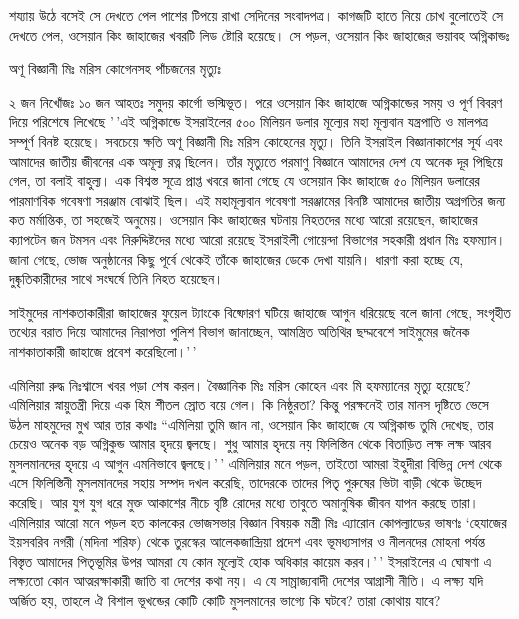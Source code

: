 \documentclass[
]{book}
\begin{document}
শয্যায় উঠে বসেই সে দেখতে পেল পাশের টিপয়ে রাখা সেদিনের সংবাদপত্র। কাগজটি হাতে নিয়ে চোখ বুলোতেই সে দেখতে পেল, ওসেয়ান কিং জাহাজের খবরটি লিড ষ্টোরি হয়েছে। সে পড়ল, ওসেয়ান কিং জাহাজের ভয়াবহ অগ্নিকান্ডঃ

অণূ বিজ্ঞানী মিঃ মরিস কোগেনসহ পাঁচজনের মৃত্যুঃ

২ জন নিখোঁজঃ ১০ জন আহতঃ সমুদয় কার্গো ভস্মিভূত। পরে ওসেয়ান কিং জাহাজে অগ্নিকান্ডের সময় ও পূর্ণ বিবরণ দিয়ে পরিশেষে লিখেছে '\,'এই অগ্নিকান্ডে ইসরাইলের ৫০০ মিলিয়ন ডলার মূল্যের মহা মূল্যবান যন্ত্রপাতি ও মালপত্র সম্পূর্ণ বিনষ্ট হয়েছে। সবচেয়ে ক্ষতি অণূ বিজ্ঞানী মিঃ মরিস কোহেনের মৃত্যু। তিনি ইসরাইল বিজ্ঞানাকাশের সূর্য এবং আমাদের জাতীয় জীবনের এক অমূল্য রত্ন ছিলেন। তাঁর মৃত্যুতে পরমাণু বিজ্ঞানে আমাদের দেশ যে অনেক দূর পিছিয়ে গেল, তা বলাই বাহুল্য। এক বিশ্বস্ত সূত্রে প্রাপ্ত খবরে জানা গেছে যে ওসেয়ান কিং জাহাজে ৫০ মিলিয়ন ডলারের পারমাণবিক গবেষণা সরঞ্জাম বোঝাই ছিল। এই মহামূল্যবান গবেষণা সরঞ্জামের বিনষ্টি আমাদের জাতীয় অগ্রগতির জন্য কত মর্মান্তিক, তা সহজেই অনুমেয়। ওসেয়ান কিং জাহাজের ঘটনায় নিহতদের মধ্যে আরো রয়েছেন, জাহাজের ক্যাপটেন জন টমসন এবং নিরুদ্দিষ্টদের মধ্যে আরো রয়েছে ইসরাইলী গোয়েন্দা বিভাগের সহকারী প্রধান মিঃ হফম্যান। জানা গেছে, ভোজ অনুষ্ঠানের কিছু পূর্বে থেকেই তাঁকে জাহাজের ডেকে দেখা যায়নি। ধারণা করা হচ্ছে যে, দুষ্কৃতিকারীদের সাথে সংঘর্ষে তিনি নিহত হয়েছেন।

সাইমুদের নাশকতাকারীরা জাহাজের ফুয়েল ট্যাংকে বিষ্ফোরণ ঘটিয়ে জাহাজে আগুন ধরিয়েছে বলে জানা গেছে, সংগৃহীত তথ্যের বরাত দিয়ে আমাদের নিরাপত্তা পুলিশ বিভাগ জানাচ্ছেন, আমন্ত্রিত অতিথির ছদ্মবেশে সাইমুমের জনৈক নাশকাতাকারী জাহাজে প্রবেশ করেছিলো।'\,'

এমিলিয়া রুদ্ধ নিঃশ্বাসে খবর পড়া শেষ করল। বৈজ্ঞানিক মিঃ মরিস কোহেন এবং মি হফম্যানের মৃত্যু হয়েছে? এমিলিয়ার স্নায়ুতন্ত্রী দিয়ে এক হিম শীতল স্রোত বয়ে গেল। কি নিষ্ঠুরতা? কিন্তু পরক্ষনেই তার মানস দৃষ্টিতে ভেসে উঠল মাহমুদের মুখ আর তার কথাঃ ``এমিলিয়া তুমি জান না, ওসেয়ান কিং জাহাজে যে অগ্নিকান্ড তুমি দেখেছ, তার চেয়েও অনেক বড় অগ্নিকুন্ড আমার হৃদয়ে জ্বলছে। শুধু আমার হৃদয়ে নয় ফিলিস্তিন থেকে বিতাড়িত লক্ষ লক্ষ আরব মুসলমানদের হৃদয়ে এ আগুন এমনিভাবে জ্বলছে।'\,' এমিলিয়ার মনে পড়ল, তাইতো আমরা ইহুদীরা বিভিন্ন দেশ থেকে এসে ফিলিস্তিনী মুসলমানদের সহায় সম্পদ দখল করেছি, তাদেরকে তাদের পিতৃ পুরুষের ভিটা বাড়ী থেকে উচ্ছেদ করেছি। আর যুগ যুগ ধরে মুক্ত আকাশের নীচে বৃষ্টি রোদের মধ্যে তাবুতে অমানুষিক জীবন যাপন করছে তারা। এমিলিয়ার আরো মনে পড়ল হত কালকের ভোজসভার বিজ্ঞান বিষয়ক মন্ত্রী মিঃ এ্যারোন কোপল্যাডের ভাষণঃ `হেযাজের ইয়সবরিব নগরী (মদিনা শরিফ) থেকে তুরস্কের আলেকজান্দ্রিয়া প্রদেশ এবং ভূমধ্যসাগর ও নীলনদের মোহনা পর্যন্ত বিস্তৃত আমাদের পিতৃভূমির উপর আমরা যে কোন মূল্যেই হোক অধিকার কায়েম করব।'\,' ইসরাইলের এ ঘোষণা এ লক্ষ্যতো কোন আত্মরক্ষাকারী জাতি বা দেশের কথা নয়। এ যে সাম্রাজ্যবাদী দেশের আগ্রাসী নীতি। এ লক্ষ্য যদি অর্জিত হয়, তাহলে ঐ বিশাল ভূখন্ডের কোটি কোটি মুসলমানের ভাগ্যে কি ঘটবে? তারা কোথায় যাবে?
\end{document}
